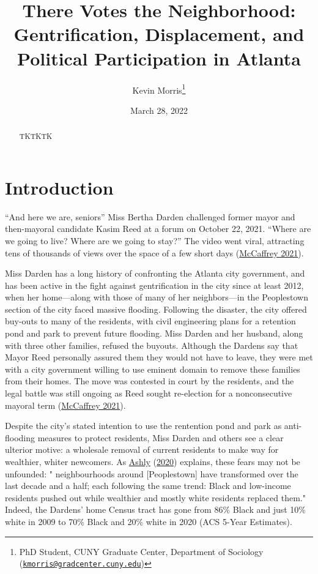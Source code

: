\documentclass[
  12pt,
]{article}
\title{There Votes the Neighborhood: Gentrification, Displacement, and Political Participation in Atlanta}
\author{Kevin Morris\footnote{PhD Student, CUNY Graduate Center, Department of Sociology (\href{mailto:kmorris@gradcenter.cuny.edu}{\nolinkurl{kmorris@gradcenter.cuny.edu}})}}
\date{March 28, 2022}
\begin{document}
\maketitle
\begin{abstract}
TKTKTK
\end{abstract}

\pagebreak

\doublespacing

\hypertarget{introduction}{%
\section{Introduction}\label{introduction}}

``And here we are, seniors'' Miss Bertha Darden challenged former mayor and then-mayoral candidate Kasim Reed at a forum on October 22, 2021. ``Where are we going to live? Where are we going to stay?'' The video went viral, attracting tens of thousands of views over the space of a few short days (\protect\hyperlink{ref-McCaffrey2021}{McCaffrey 2021}).

Miss Darden has a long history of confronting the Atlanta city government, and has been active in the fight against gentrification in the city since at least 2012, when her home---along with those of many of her neighbors---in the Peoplestown section of the city faced massive flooding. Following the disaster, the city offered buy-outs to many of the residents, with civil engineering plans for a retention pond and park to prevent future flooding. Miss Darden and her husband, along with three other families, refused the buyouts. Although the Dardens say that Mayor Reed personally assured them they would not have to leave, they were met with a city government willing to use eminent domain to remove these families from their homes. The move was contested in court by the residents, and the legal battle was still ongoing as Reed sought re-election for a nonconsecutive mayoral term (\protect\hyperlink{ref-McCaffrey2021}{McCaffrey 2021}).

Despite the city's stated intention to use the rentention pond and park as anti-flooding measures to protect residents, Miss Darden and others see a clear ulterior motive: a wholesale removal of current residents to make way for wealthier, whiter newcomers. As \protect\hyperlink{ref-Ashly2020}{Ashly} (\protect\hyperlink{ref-Ashly2020}{2020}) explains, these fears may not be unfounded: " neighbourhoods around {[}Peoplestown{]} have transformed over the last decade and a half; each following the same trend: Black and low-income residents pushed out while wealthier and mostly white residents replaced them." Indeed, the Dardens' home Census tract has gone from 86\% Black and just 10\% white in 2009 to 70\% Black and 20\% white in 2020 (ACS 5-Year Estimates).
\end{document}

